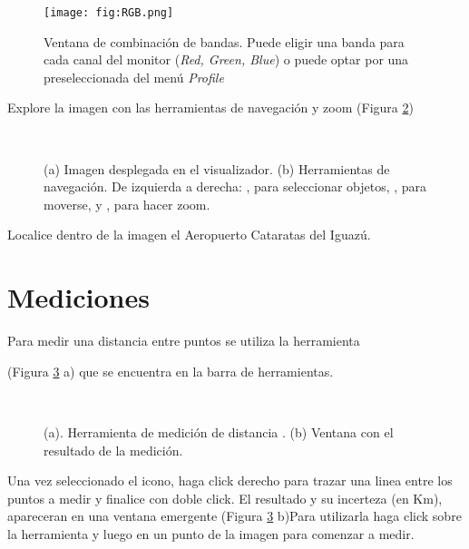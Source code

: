 \begin{figure}[h!]
    \centering
    \texttt{[image: fig:RGB.png]}
    \caption{Ventana de combinación de bandas. Puede eligir una banda para cada canal del monitor (\emph{Red, Green, Blue}) o puede optar por una preseleccionada del menú \emph{Profile}}
    \label{fig:RGB}
\end{figure}

Explore la imagen con las herramientas de navegación y zoom (Figura \ref{fig:mono})

\begin{figure}[h!]
    \centering
    \\
    \caption{(a) Imagen desplegada en el visualizador. (b) Herramientas de navegación. De izquierda a derecha: , para seleccionar objetos, , para moverse, y , para hacer zoom.}
    \label{fig:mono}
\end{figure}

Localice dentro de la imagen el Aeropuerto Cataratas del Iguazú.

\section{Mediciones}

Para medir una distancia entre puntos se utiliza la herramienta
\begin{center}
\end{center}
  (Figura \ref{fig:distancia} a) que se encuentra en la barra de herramientas.

\begin{figure}[h!]
    \centering
    \\
    \caption{(a). Herramienta de medición de distancia . (b) Ventana con el resultado de la medición.}
    \label{fig:distancia}
\end{figure}

Una vez seleccionado el icono, haga click derecho para trazar una linea entre los puntos a medir y finalice con doble click. El resultado y su incerteza (en Km), apareceran en una ventana emergente (Figura \ref{fig:distancia} b)Para utilizarla haga click sobre la herramienta y luego en un punto de la imagen para comenzar a medir.

